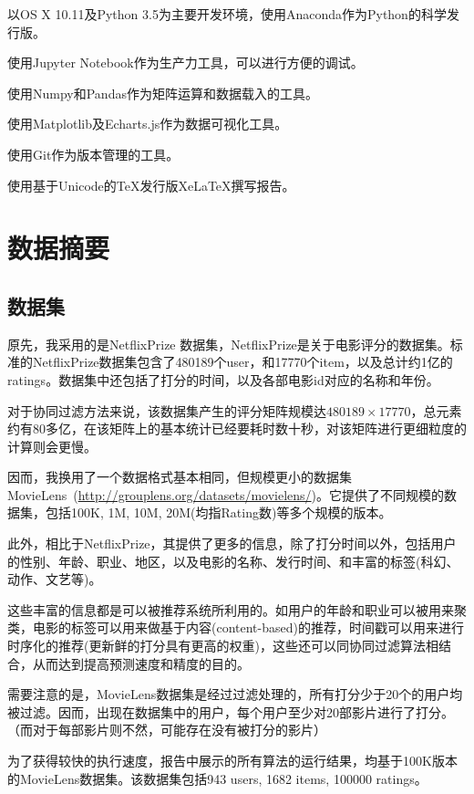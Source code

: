 \documentclass[utf8, a4paper, 11pt, onecolumn]{ctexart}
\begin{document}
\begin{spacing}{1.25}
以OS X 10.11及Python 3.5为主要开发环境，使用Anaconda作为Python的科学发行版。

使用Jupyter Notebook作为生产力工具，可以进行方便的调试。

使用Numpy和Pandas作为矩阵运算和数据载入的工具。

使用Matplotlib及Echarts.js作为数据可视化工具。

使用Git作为版本管理的工具。

使用基于Unicode的TeX发行版XeLaTeX撰写报告。

\section{数据摘要}

\subsection{数据集}

原先，我采用的是NetflixPrize 数据集，NetflixPrize是关于电影评分的数据集。标准的NetflixPrize数据集包含了480189个user，和17770个item，以及总计约1亿的ratings。数据集中还包括了打分的时间，以及各部电影id对应的名称和年份。

对于协同过滤方法来说，该数据集产生的评分矩阵规模达$480189 \times 17770$，总元素约有80多亿，在该矩阵上的基本统计已经要耗时数十秒，对该矩阵进行更细粒度的计算则会更慢。

因而，我换用了一个数据格式基本相同，但规模更小的数据集MovieLens\ (\url{http://grouplens.org/datasets/movielens/})。它提供了不同规模的数据集，包括100K, 1M, 10M, 20M(均指Rating数)等多个规模的版本。

此外，相比于NetflixPrize，其提供了更多的信息，除了打分时间以外，包括用户的性别、年龄、职业、地区，以及电影的名称、发行时间、和丰富的标签(科幻、动作、文艺等)。

这些丰富的信息都是可以被推荐系统所利用的。如用户的年龄和职业可以被用来聚类，电影的标签可以用来做基于内容(content-based)的推荐，时间戳可以用来进行时序化的推荐(更新鲜的打分具有更高的权重)，这些还可以同协同过滤算法相结合，从而达到提高预测速度和精度的目的。

需要注意的是，MovieLens数据集是经过过滤处理的，所有打分少于20个的用户均被过滤。因而，出现在数据集中的用户，每个用户至少对20部影片进行了打分。（而对于每部影片则不然，可能存在没有被打分的影片）

为了获得较快的执行速度，报告中展示的所有算法的运行结果，均基于100K版本的MovieLens数据集。该数据集包括943 users, 1682 items, 100000 ratings。


\end{spacing}
\end{document}
